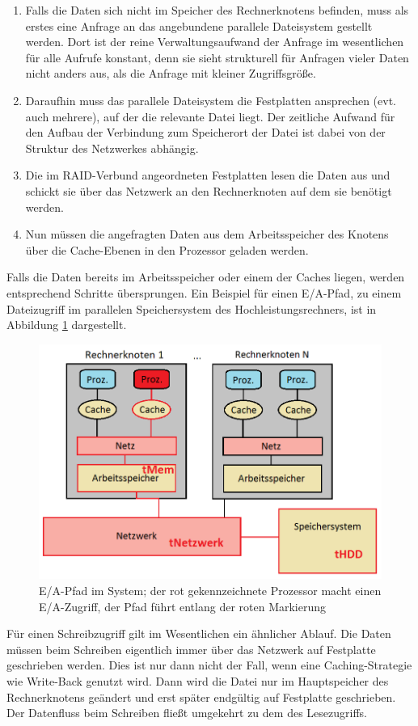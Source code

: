 \documentclass[
	12pt,
	a4paper,
	BCOR10mm,
	DIV14,
	listof=totoc,
	bibliography=totoc,
	headsepline
]{scrreprt}
\begin{document}
\begin{enumerate}
\item Falls die Daten sich nicht im Speicher des Rechnerknotens befinden, muss als erstes eine Anfrage an das angebundene parallele Dateisystem gestellt werden.
Dort ist der reine Verwaltungsaufwand der Anfrage im wesentlichen für alle Aufrufe konstant, denn sie sieht strukturell für Anfragen vieler Daten nicht anders aus, als die Anfrage mit kleiner Zugriffsgröße.
\item Daraufhin muss das parallele Dateisystem die Festplatten ansprechen (evt. auch mehrere), auf der die relevante Datei liegt. Der zeitliche Aufwand für den Aufbau der Verbindung zum Speicherort der Datei ist dabei von der Struktur des Netzwerkes abhängig.
\item Die im RAID-Verbund angeordneten Festplatten lesen die Daten aus und schickt sie über das Netzwerk an den Rechnerknoten auf dem sie benötigt werden.
\item Nun müssen die angefragten Daten aus dem Arbeitsspeicher des Knotens über die Cache-Ebenen in den Prozessor geladen werden. 
\end{enumerate}
Falls die Daten bereits im Arbeitsspeicher oder einem der Caches liegen, werden entsprechend Schritte übersprungen. Ein Beispiel für einen E/A-Pfad, zu einem Dateizugriff im parallelen Speichersystem des Hochleistungsrechners, ist in Abbildung \ref{fig:ea_pfad} dargestellt.\medskip

\begin{figure}[h]
	\begin{center}
		\includegraphics[width=.43\textwidth]{Bilder/rechnerknoten_ea_pfad.png}
	\end{center}
	\caption{E/A-Pfad im System; der rot gekennzeichnete Prozessor macht einen E/A-Zugriff, der Pfad führt entlang der roten Markierung}
	\label{fig:ea_pfad}
\end{figure}

Für einen Schreibzugriff gilt im Wesentlichen ein ähnlicher Ablauf.
Die Daten müssen beim Schreiben eigentlich immer über das Netzwerk auf Festplatte geschrieben werden. Dies ist nur dann nicht der Fall, wenn eine Caching-Strategie wie Write-Back genutzt wird. Dann wird die Datei nur im Hauptspeicher des Rechnerknotens geändert und erst später endgültig auf Festplatte geschrieben.
Der Datenfluss beim Schreiben fließt umgekehrt zu dem des Lesezugriffs.
\end{document}
